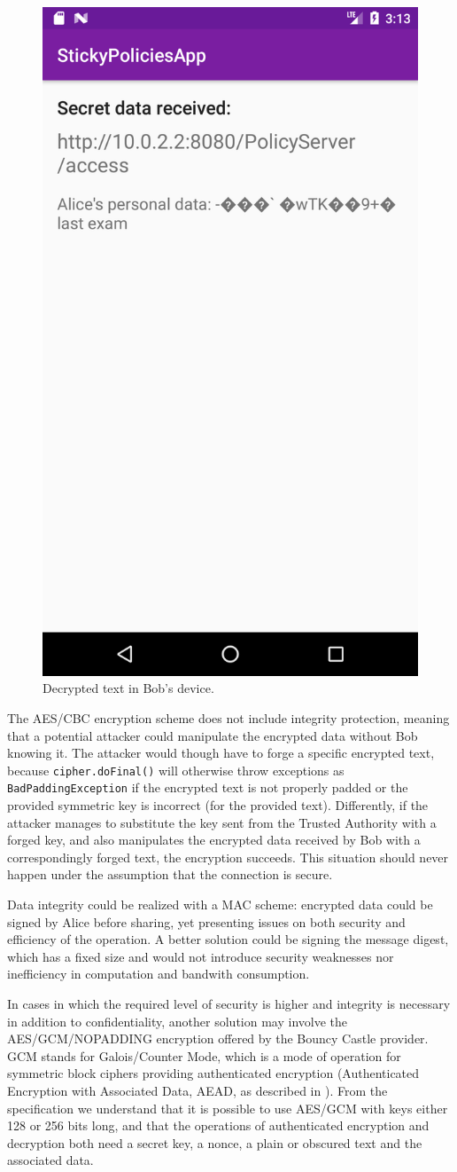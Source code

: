 \begin{figure}
	\centering
	\includegraphics[width=0.35\linewidth]{DecryptCBCInvalidIV.png}
	\caption{Decrypted text in Bob's device.}
	\label{fig:DecryptCBCInvalidIV}
\end{figure}

The AES/CBC encryption scheme does not include integrity protection, meaning that a potential attacker could manipulate the encrypted data without Bob knowing it. The attacker would though have to forge a specific encrypted text, because \texttt{cipher.doFinal()} will otherwise throw exceptions as \texttt{BadPaddingException} if the encrypted text is not properly padded or the provided symmetric key is incorrect (for the provided text). Differently, if the attacker manages to substitute the key sent from the Trusted Authority with a forged key, and also manipulates the encrypted data received by Bob with a correspondingly forged text, the encryption succeeds. This situation should never happen under the assumption that the connection is secure.

Data integrity could be realized with a MAC scheme: encrypted data could be signed by Alice before sharing, yet presenting issues on both security and efficiency of the operation. A better solution could be signing the message digest, which has a fixed size and would not introduce security weaknesses nor inefficiency in computation and bandwith consumption.

In cases in which the required level of security is higher and integrity is necessary in addition to confidentiality, another solution may involve the AES/GCM/NOPADDING encryption offered by the Bouncy Castle provider. GCM stands for Galois/Counter Mode, which is a mode of operation for symmetric block ciphers providing authenticated encryption (Authenticated Encryption with Associated Data, AEAD, as described in \cite{rfc5116}). From the specification we understand that it is possible to use AES/GCM with keys either 128 or 256 bits long, and that the operations of authenticated encryption and decryption both need a secret key, a nonce, a plain or obscured text and the associated data.

